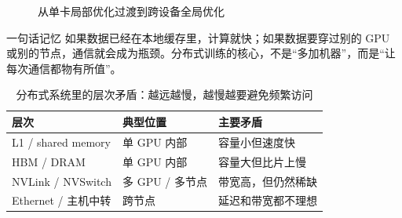 \begin{figure}[H]
\centering
{}
\caption{从单卡局部优化过渡到跨设备全局优化}
\end{figure}

\begin{knowledgebox}{一句话记忆}
如果数据已经在本地缓存里，计算就快；如果数据要穿过别的 GPU 或别的节点，通信就会成为瓶颈。分布式训练的核心，不是“多加机器”，而是“让每次通信都物有所值”。
\end{knowledgebox}

\begin{table}[H]
\centering
\begin{tabular}{lll}
\toprule
\textbf{层次} & \textbf{典型位置} & \textbf{主要矛盾} \\
\midrule
L1 / shared memory & 单 GPU 内部 & 容量小但速度快 \\
HBM / DRAM & 单 GPU 内部 & 容量大但比片上慢 \\
NVLink / NVSwitch & 多 GPU / 多节点 & 带宽高，但仍然稀缺 \\
Ethernet / 主机中转 & 跨节点 & 延迟和带宽都不理想 \\
\bottomrule
\end{tabular}
\caption{分布式系统里的层次矛盾：越远越慢，越慢越要避免频繁访问}
\end{table}

